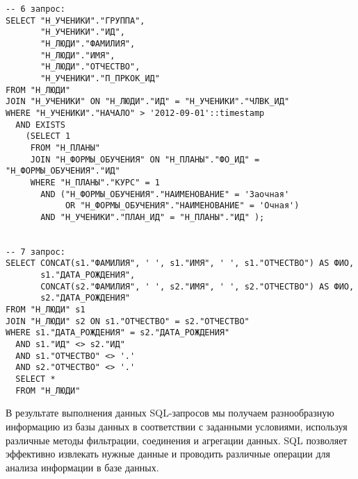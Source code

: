 \documentclass[14pt]{extreport}
\begin{document}
\begin{verbatim}
-- 6 запрос:
SELECT "Н_УЧЕНИКИ"."ГРУППА",
       "Н_УЧЕНИКИ"."ИД",
       "Н_ЛЮДИ"."ФАМИЛИЯ",
       "Н_ЛЮДИ"."ИМЯ",
       "Н_ЛЮДИ"."ОТЧЕСТВО",
       "Н_УЧЕНИКИ"."П_ПРКОК_ИД"
FROM "Н_ЛЮДИ"
JOIN "Н_УЧЕНИКИ" ON "Н_ЛЮДИ"."ИД" = "Н_УЧЕНИКИ"."ЧЛВК_ИД"
WHERE "Н_УЧЕНИКИ"."НАЧАЛО" > '2012-09-01'::timestamp
  AND EXISTS
    (SELECT 1
     FROM "Н_ПЛАНЫ"
     JOIN "Н_ФОРМЫ_ОБУЧЕНИЯ" ON "Н_ПЛАНЫ"."ФО_ИД" = "Н_ФОРМЫ_ОБУЧЕНИЯ"."ИД"
     WHERE "Н_ПЛАНЫ"."КУРС" = 1
       AND ("Н_ФОРМЫ_ОБУЧЕНИЯ"."НАИМЕНОВАНИЕ" = 'Заочная'
            OR "Н_ФОРМЫ_ОБУЧЕНИЯ"."НАИМЕНОВАНИЕ" = 'Очная')
       AND "Н_УЧЕНИКИ"."ПЛАН_ИД" = "Н_ПЛАНЫ"."ИД" );


-- 7 запрос:
SELECT CONCAT(s1."ФАМИЛИЯ", ' ', s1."ИМЯ", ' ', s1."ОТЧЕСТВО") AS ФИО,
       s1."ДАТА_РОЖДЕНИЯ",
       CONCAT(s2."ФАМИЛИЯ", ' ', s2."ИМЯ", ' ', s2."ОТЧЕСТВО") AS ФИО,
       s2."ДАТА_РОЖДЕНИЯ"
FROM "Н_ЛЮДИ" s1
JOIN "Н_ЛЮДИ" s2 ON s1."ОТЧЕСТВО" = s2."ОТЧЕСТВО"
WHERE s1."ДАТА_РОЖДЕНИЯ" = s2."ДАТА_РОЖДЕНИЯ"
  AND s1."ИД" <> s2."ИД"
  AND s1."ОТЧЕСТВО" <> '.'
  AND s2."ОТЧЕСТВО" <> '.'
  SELECT *
  FROM "Н_ЛЮДИ"
        \end{verbatim}
    \conclusions В результате выполнения данных SQL-запросов мы получаем разнообразную информацию из базы данных в соответствии с заданными условиями, используя различные методы фильтрации, соединения и агрегации данных. SQL позволяет эффективно извлекать нужные данные и проводить различные операции для анализа информации в базе данных.
\end{document}
